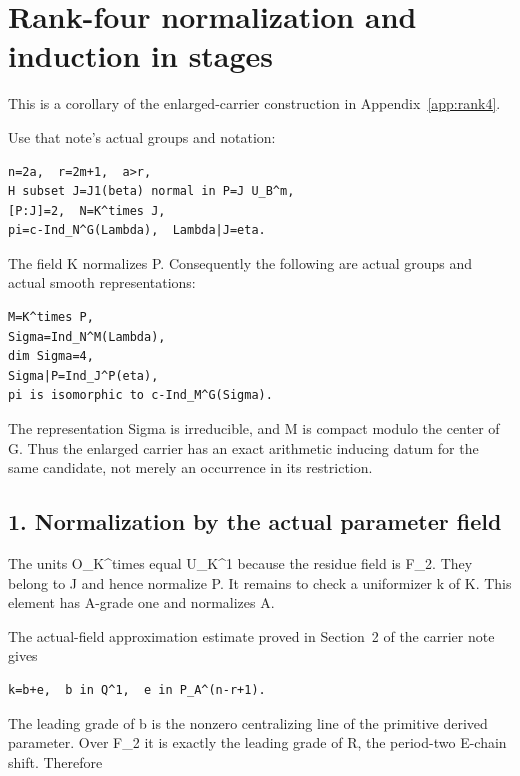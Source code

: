 \clearpage
\section{Rank-four normalization and induction in stages}\label{app:rank4_stages}

This is a corollary of the enlarged-carrier construction in
Appendix~\ref{app:rank4}.

Use that note's actual groups and notation:

\begin{Verbatim}[fontsize=\small,breaklines=true,breakanywhere=true]
n=2a,  r=2m+1,  a>r,
H subset J=J1(beta) normal in P=J U_B^m,
[P:J]=2,  N=K^times J,
pi=c-Ind_N^G(Lambda),  Lambda|J=eta.
\end{Verbatim}

The field K normalizes P. Consequently the following are actual groups
and actual smooth representations:

\begin{Verbatim}[fontsize=\small,breaklines=true,breakanywhere=true]
M=K^times P,
Sigma=Ind_N^M(Lambda),
dim Sigma=4,
Sigma|P=Ind_J^P(eta),
pi is isomorphic to c-Ind_M^G(Sigma).
\end{Verbatim}

The representation Sigma is irreducible, and M is compact modulo the
center of G. Thus the enlarged carrier has an exact arithmetic inducing
datum for the same candidate, not merely an occurrence in its
restriction.

\hypertarget{rank4_stages-normalization-by-the-actual-parameter-field}{%
\subsection{1. Normalization by the actual parameter
field}\label{rank4_stages-normalization-by-the-actual-parameter-field}}

The units O\_K\^{}times equal U\_K\^{}1 because the residue field is
F\_2. They belong to J and hence normalize P. It remains to check a
uniformizer k of K. This element has A-grade one and normalizes A.

The actual-field approximation estimate proved in Section~2 of the
carrier note gives

\begin{Verbatim}[fontsize=\small,breaklines=true,breakanywhere=true]
k=b+e,  b in Q^1,  e in P_A^(n-r+1).
\end{Verbatim}

The leading grade of b is the nonzero centralizing line of the primitive
derived parameter. Over F\_2 it is exactly the leading grade of R, the
period-two E-chain shift. Therefore

